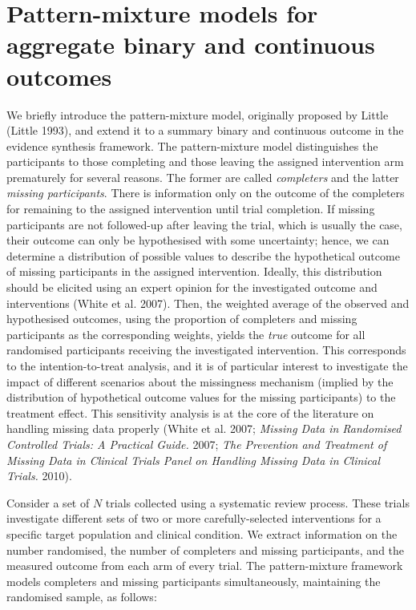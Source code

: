 \hypertarget{pattern-mixture-models-for-aggregate-binary-and-continuous-outcomes}{%
\section{Pattern-mixture models for aggregate binary and continuous outcomes}\label{pattern-mixture-models-for-aggregate-binary-and-continuous-outcomes}}

We briefly introduce the pattern-mixture model, originally proposed by Little
(Little 1993), and extend it to a summary binary and continuous outcome in the
evidence synthesis framework. The pattern-mixture model distinguishes the participants
to those completing and those leaving the assigned intervention arm prematurely
for several reasons. The former are called \emph{completers} and the latter
\emph{missing participants}. There is information only on the outcome of the completers
for remaining to the assigned intervention until trial completion. If missing
participants are not followed-up after leaving the trial, which is usually the case,
their outcome can only be hypothesised with some uncertainty; hence, we can determine
a distribution of possible values to describe the hypothetical outcome of missing
participants in the assigned intervention. Ideally, this distribution should be elicited
using an expert opinion for the investigated outcome and interventions (White et al. 2007).
Then, the weighted average of the observed and hypothesised outcomes, using the
proportion of completers and missing participants as the corresponding weights,
yields the \emph{true} outcome for all randomised participants receiving the investigated
intervention. This corresponds to the intention-to-treat analysis, and it is of
particular interest to investigate the impact of different scenarios about the
missingness mechanism (implied by the distribution of hypothetical outcome
values for the missing participants) to the treatment effect. This sensitivity
analysis is at the core of the literature on handling missing data properly
(White et al. 2007; \emph{Missing Data in Randomised Controlled Trials: A Practical Guide.} 2007; \emph{The Prevention and Treatment of Missing Data in Clinical Trials Panel on Handling Missing Data in Clinical Trials.} 2010).

Consider a set of \(N\) trials collected using a systematic review process. These
trials investigate different sets of two or more carefully-selected interventions
for a specific target population and clinical condition. We extract information on
the number randomised, the number of completers and missing participants, and the
measured outcome from each arm of every trial. The pattern-mixture framework models
completers and missing participants simultaneously, maintaining the randomised
sample, as follows:

